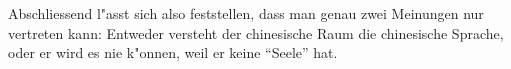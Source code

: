 \documentclass[a4paper, emulatestandardclasses, 12pt]{scrartcl}
\begin{document}
\begin{onehalfspace}
Abschliessend l"asst sich also feststellen, dass man genau zwei Meinungen nur vertreten kann: Entweder versteht der chinesische Raum die chinesische Sprache, oder er wird es nie k"onnen, weil er keine "`Seele"' hat. 





 
 

\noindent 




\end{onehalfspace}
\end{document}
